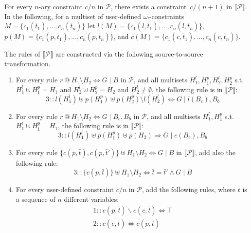 \documentclass{tlp}
\newcommand{\mcP}{\ensuremath{\mathcal{P}}}
\newcommand{\bang}{\ensuremath{!}}
\newcommand{\obang}{\ensuremath{{\omega_\bang}}}
\begin{document}
For every $n$-ary constraint $c/n$ in $\mcP$, there exists a constraint~$c/(n+1)$
in $\llbracket \mcP \rrbracket$. In the following, for a multiset of user-defined
$\obang$-constraints~$M=\{c_1(\bar t_1), \ldots, c_n(\bar t_n)\}$ let $l(M) =
\{c_1(l, \bar t_1),\ldots,c_n(l, \bar t_n)\}$, $p(M) = \{c_1(p, \bar
t_1),\ldots,c_n(p, \bar t_n)\}$, and $c(M) = \{c_1(c, \bar t_1),\ldots,c_n(c,
\bar t_n)\}$.

The rules of $\llbracket \mcP \rrbracket$ are constructed via the following
source-to-source transformation.
\begin{enumerate}
  \item \label{b2r:applin} For every rule $r\ @\ H_1\setminus H_2
  \Leftrightarrow G\mid B$ in $\mcP$, and all multisets
  $H_1^l,H_1^p,H_2^l,H_2^p$ s.t. $H_1^l\uplus H_1^p = H_1$ and $H_2^l\uplus
  H_2^p = H_2$ and $H_2^l\neq\emptyset$, the following rule is in $\llbracket
  \mcP\rrbracket$:
  \[
  	3:: l(H_1^l)\uplus p(H_1^p)\uplus p(H_2^p)\setminus l(H_2^l) \Leftrightarrow
  	G\mid l(B_c), B_b
  \]
  \item \label{b2r:appper} For every rule $r\ @\ H_1\setminus H_2
  \Leftrightarrow G\mid B_c,B_b$ in $\mcP$, and all multisets $H_1^l,H_1^p$ s.t.
  $H_1^l\uplus H_1^p = H_1$, the following rule is in $\llbracket
  \mcP\rrbracket$:
  \[
  	3:: l(H_1^l)\uplus p(H_1^p)\uplus p(H_2) \Longrightarrow G\mid c(B_c),B_b
  \]
  \item \label{b2r:appcon} For every rule $\{c(p,\bar t),c(p,{\bar t}')\}\uplus H_1\setminus H_2
  \Leftrightarrow G\mid B$ in $\llbracket \mcP\rrbracket$, add also the
  following rule:
  \[
	3:: \{c(p,\bar t)\}\uplus H_1\setminus H_2 \Leftrightarrow \bar t={\bar
	t}'\wedge G\mid B
  \]
  \item \label{b2r:con} For every user-defined constraint $c/n$ in
  $\mcP$, add the following rules, where $\bar t$ is a sequence of $n$ different
  variables:
  \[
    \begin{array}{l}
	  1:: c(p, \bar t) \backslash c(c, \bar t) \Leftrightarrow \top\\
	  2:: c(c, \bar t) \Leftrightarrow c(p, \bar t)
	\end{array}
  \]
\end{enumerate}
\end{document}
